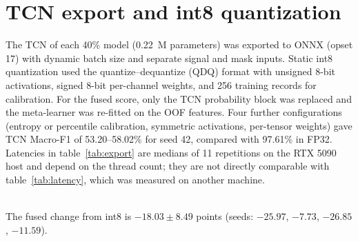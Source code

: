 \documentclass{iopjournal}
\begin{document}
\section{TCN export and int8 quantization}\label{app:export}
\setcounter{table}{0}
\renewcommand{\thetable}{B\arabic{table}}

The TCN of each 40\% model (0.22~M parameters) was exported to ONNX (opset 17) with dynamic batch size and separate signal and mask inputs. Static int8 quantization used the quantize--dequantize (QDQ) format with unsigned 8-bit activations, signed 8-bit per-channel weights, and 256 training records for calibration. For the fused score, only the TCN probability block was replaced and the meta-learner was re-fitted on the OOF features. Four further configurations (entropy or percentile calibration, symmetric activations, per-tensor weights) gave TCN Macro-F1 of 53.20--58.02\% for seed 42, compared with 97.61\% in FP32. Latencies in table~\ref{tab:export} are medians of 11 repetitions on the RTX 5090 host and depend on the thread count; they are not directly comparable with table~\ref{tab:latency}, which was measured on another machine.

\begin{table}[htbp]
\caption{Accuracy and latency of the exported TCN at 40\% labels (four seeds).}
\label{tab:export}
\centering
{}\\[2pt]
{\footnotesize The fused change from int8 is $-18.03\pm8.49$ points (seeds: $-25.97$, $-7.73$, $-26.85$, $-11.59$).}
\end{table}
\end{document}
